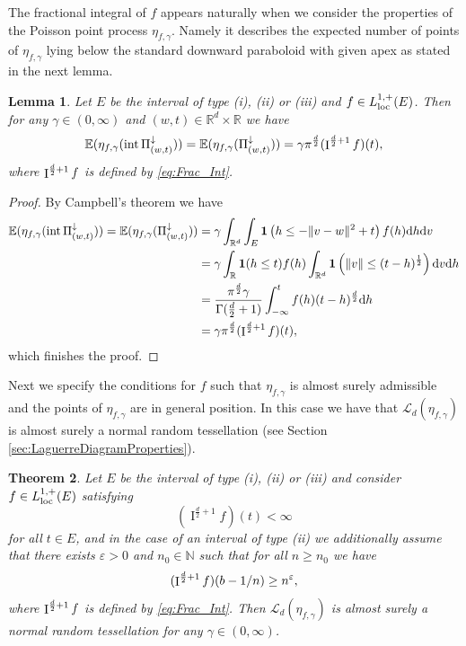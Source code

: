 \documentclass[11pt,a4paper]{article}
\theoremstyle{plain}
\newtheorem{theorem}{Theorem}[section]
\newtheorem{lemma}[theorem]{Lemma}
\theoremstyle{definition}
\theoremstyle{remark}
\def\EE{\mathbb{E}}
\def\NN{\mathbb{N}}
\def\RR{\mathbb{R}}
\def\cL{\mathcal{L}}
\newcommand{\dd}{{\rm d}}
\newcommand{\frI}{\mathop{\mathrm{I}}\nolimits}
\newcommand{\inter}{\operatorname{int}}
\begin{document}
The fractional integral of $f$ appears naturally when we consider the properties of the Poisson point process $\eta_{f,\gamma}$. Namely it describes the expected number of points of $\eta_{f,\gamma}$ lying below the standard downward paraboloid with given apex as stated in the next lemma.

\begin{lemma}\label{lm:IntensityParabola}
    Let $E$ be the interval of type (i), (ii) or (iii) and $f\in L_{\rm loc}^{1,+}(E)$. Then for any $\gamma\in (0,\infty)$ and $(w,t)\in \RR^d\times \RR$ we have
    \[
    \EE(\eta_{f,\gamma}(\inter \Pi^{\downarrow}_{(w,t)}))=\EE(\eta_{f,\gamma}(\Pi^{\downarrow}_{(w,t)}))=\gamma\pi^{\frac{d}{2}}(\frI^{{d\over 2}+1}f)(t),
    \]
    where $\frI^{{d\over 2}+1}f$ is defined by \eqref{eq:Frac_Int}.
\end{lemma}
\begin{proof}
    By Campbell's theorem \cite[Theorem 3.1.2]{SW} we have
    \begin{align*}
        \EE(\eta_{f,\gamma}(\inter \Pi^{\downarrow}_{(w,t)}))=\EE(\eta_{f,\gamma}(\Pi^{\downarrow}_{(w,t)})) &= \gamma\int_{\RR^d} \int_{E} {\bf 1}\left(h\le-\|v-w\|^2+t\right) f(h) \dd h \dd v \\
        &= \gamma\int_{\RR}{\bf 1}(h\le t) f(h) \int_{\RR^d} {\bf 1}\left(\lVert v \rVert \le (t - h)^\frac{1}{2}\right)\dd v\dd h\\ 
        &= \frac{\pi^{\frac{d}{2}}\gamma}{\Gamma({\frac{d}{2}}+1)}\int_{-\infty}^t f(h)(t - h)^\frac{d}{2}\dd h \\
        &= \gamma\pi^{\frac{d}{2}} (\frI^{\frac{d}{2}+1}f)(t),
    \end{align*}
    which finishes the proof.
\end{proof}

Next we specify the conditions for $f$ such that $\eta_{f,\gamma}$ is almost surely admissible and the points of $\eta_{f,\gamma}$ are in general position. In this case we have that $\cL_d(\eta_{f,\gamma})$ is almost surely a normal random tessellation (see Section \ref{sec:LaguerreDiagramProperties}).

\begin{theorem}\label{thm:FICondition}
    Let $E$ be the interval of type (i), (ii) or (iii) and consider $f\in L_{\rm loc}^{1,+}(E)$ satisfying
    \begin{equation}\label{eq:FICondition}
        (\frI^{\frac{d}{2}+1}f)(t) <\infty
    \end{equation}
    for all $t\in E$, and in the case of an interval of type (ii) we additionally assume that there exists $\varepsilon > 0$ and $n_0\in \NN$ such that for all $n\ge n_0$ we have
    \begin{align}\label{eq:frI_conv}    
        (\frI^{{d\over 2}+1}f)(b-1/n) \ge n^\varepsilon,
    \end{align}
    where $\frI^{{d\over 2}+1}f$ is defined by \eqref{eq:Frac_Int}. Then $\cL_d(\eta_{f,\gamma})$ is almost surely a normal random tessellation for any $\gamma\in(0,\infty)$.
\end{theorem}
\end{document}
